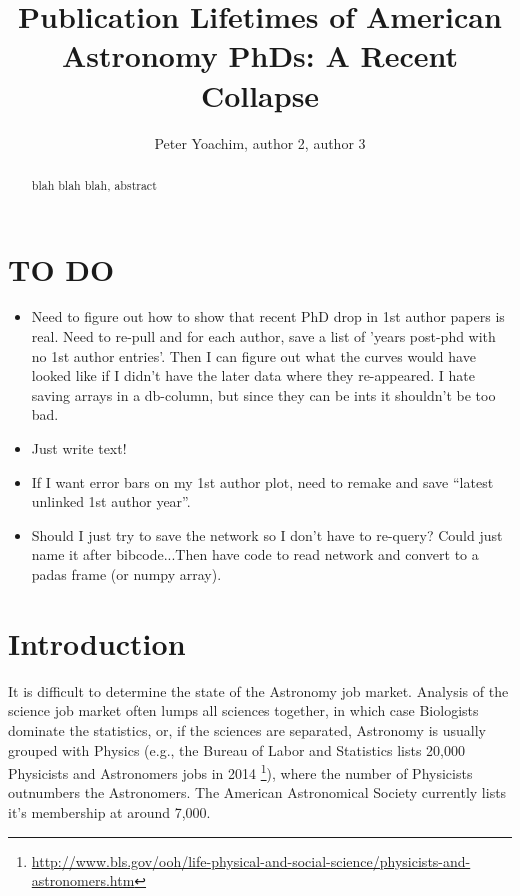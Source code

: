 \documentclass{emulateapj}
\begin{document}
\title{Publication Lifetimes of American Astronomy PhDs: A Recent Collapse}

\author{Peter Yoachim, author 2, author 3 
  }


\begin{abstract}
blah blah blah, abstract

\end{abstract}


\section{TO DO}
\begin{itemize}
\item{Need to figure out how to show that recent PhD drop in 1st author papers is real. Need to re-pull and for each author, save a list of 'years post-phd with no 1st author entries'.  Then I can figure out what the curves would have looked like if I didn't have the later data where they re-appeared. I hate saving arrays in a db-column, but since they can be ints it shouldn't be too bad.}
\item{Just write text! }
\item{If I want error bars on my 1st author plot, need to remake and save ``latest unlinked 1st author year''.}
  \item{Should I just try to save the network so I don't have to re-query? Could just name it after bibcode...Then have code to read network and convert to a padas frame (or numpy array).}
\end{itemize}

\section{Introduction}

It is difficult to determine the state of the Astronomy job market.  Analysis of the science job market often lumps all sciences together, in which case Biologists dominate the statistics, or, if the sciences are separated, Astronomy is usually grouped with Physics (e.g., the Bureau of Labor and Statistics lists 20,000 Physicists and Astronomers jobs in 2014 \footnote{\url{http://www.bls.gov/ooh/life-physical-and-social-science/physicists-and-astronomers.htm}}), where the number of Physicists outnumbers the Astronomers.  The American Astronomical Society currently lists it's membership at around 7,000.
\end{document}
